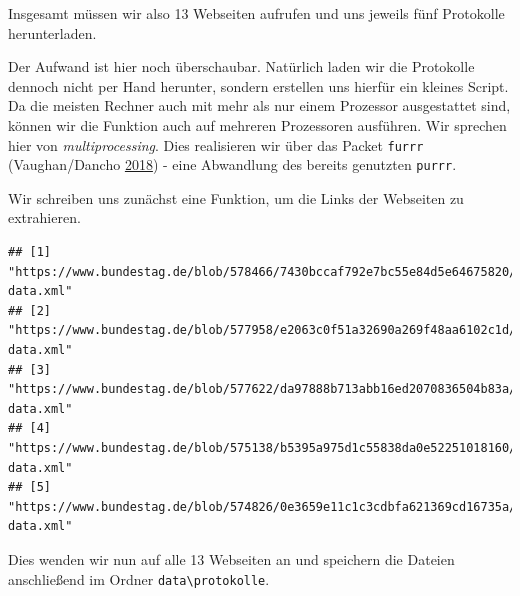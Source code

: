 \documentclass[oneside, 12pt, numbers=endperiod]{scrbook}
\newenvironment{Shaded}{\begin{snugshade}}{\end{snugshade}}
\newcommand{\ControlFlowTok}[1]{\textcolor[rgb]{0.13,0.29,0.53}{\textbf{#1}}}
\newcommand{\KeywordTok}[1]{\textcolor[rgb]{0.13,0.29,0.53}{\textbf{#1}}}
\newcommand{\NormalTok}[1]{#1}
\newcommand{\OperatorTok}[1]{\textcolor[rgb]{0.81,0.36,0.00}{\textbf{#1}}}
\newcommand{\StringTok}[1]{\textcolor[rgb]{0.31,0.60,0.02}{#1}}
\theoremstyle{definition}
\theoremstyle{definition}
\theoremstyle{definition}
\theoremstyle{remark}
\begin{document}
Insgesamt müssen wir also 13 Webseiten aufrufen und uns jeweils fünf
Protokolle herunterladen.

Der Aufwand ist hier noch überschaubar. Natürlich laden wir die
Protokolle dennoch nicht per Hand herunter, sondern erstellen uns
hierfür ein kleines Script. Da die meisten Rechner auch mit mehr als nur
einem Prozessor ausgestattet sind, können wir die Funktion auch auf
mehreren Prozessoren ausführen. Wir sprechen hier von
\emph{multiprocessing}. Dies realisieren wir über das Packet
\texttt{furrr} (Vaughan/Dancho
\protect\hyperlink{ref-vaughan_2018}{2018}) - eine Abwandlung des
bereits genutzten \texttt{purrr}.

Wir schreiben uns zunächst eine Funktion, um die Links der Webseiten zu
extrahieren.

\begin{Shaded}
\end{Shaded}

\begin{verbatim}
## [1] "https://www.bundestag.de/blob/578466/7430bccaf792e7bc55e84d5e64675820/19062-data.xml"
## [2] "https://www.bundestag.de/blob/577958/e2063c0f51a32690a269f48aa6102c1d/19061-data.xml"
## [3] "https://www.bundestag.de/blob/577622/da97888b713abb16ed2070836504b83a/19060-data.xml"
## [4] "https://www.bundestag.de/blob/575138/b5395a975d1c55838da0e52251018160/19059-data.xml"
## [5] "https://www.bundestag.de/blob/574826/0e3659e11c1c3cdbfa621369cd16735a/19058-data.xml"
\end{verbatim}

Dies wenden wir nun auf alle 13 Webseiten an und speichern die Dateien
anschließend im Ordner \texttt{data\textbackslash{}protokolle}.
\end{document}
